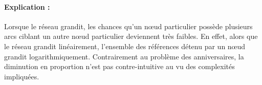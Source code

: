 \paragraph{Explication :} Lorsque le réseau grandit, les chances qu'un nœud
particulier possède plusieurs arcs ciblant un autre nœud particulier deviennent
très faibles. En effet, alors que le réseau grandit linéairement, l'ensemble des
références détenu par un nœud grandit logarithmiquement. Contrairement au
problème des anniversaires, la diminution en proportion n'est pas
contre-intuitive au vu des complexités impliquées.


